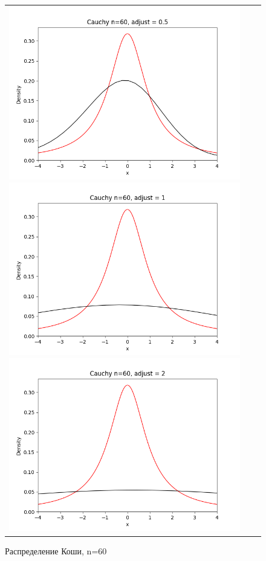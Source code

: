 \begin{figure}[H]
	\begin{tabular}{ccc}
		\includegraphics[scale=0.33]{cauchy_n60_adjust0.5.png}
		\includegraphics[scale=0.33]{cauchy_n60_adjust1.png}
		\includegraphics[scale=0.33]{cauchy_n60_adjust2.png}
	\end{tabular}
	\caption{Распределение Коши, n=60}
\end{figure}

